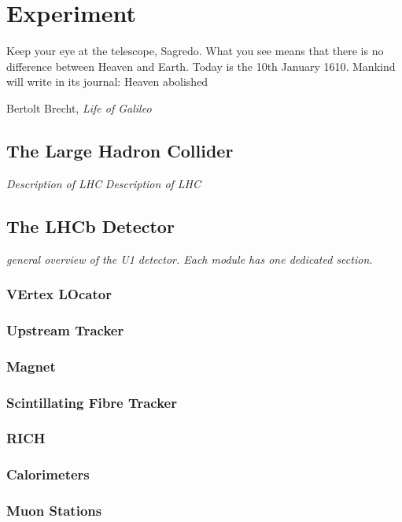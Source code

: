 
\chapter{Experiment}
\label{chp:experiment}

\epigraph{Keep your eye at the telescope, Sagredo. What you see means that there is no difference between Heaven
and Earth. Today is the 10th January 1610. Mankind will write in its journal: Heaven abolished}{Bertolt Brecht, \textit{Life of Galileo}}
\section{The Large Hadron Collider}
\textit{Description of LHC}
\textit{Description of LHC 
}

\section{The LHCb Detector}
\textit{general overview of the U1 detector. Each module has one dedicated section.
}
\subsection{VErtex LOcator}
\subsection{Upstream Tracker}
\subsection{Magnet}
\subsection{Scintillating Fibre Tracker}
\subsection{RICH}
\subsection{Calorimeters}
\subsection{Muon Stations}
